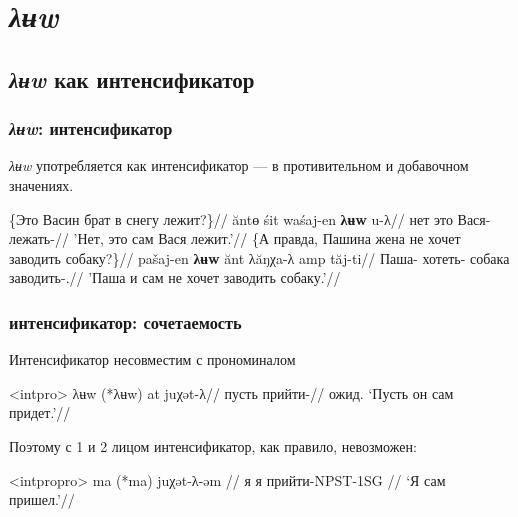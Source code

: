 \documentclass{beamer}
\begin{document}
\section{\textit{λʉw}}

\subsection{\textit{λʉw} как интенсификатор}

\begin{frame}
    \frametitle{\textit{λʉw}: интенсификатор}

    \textit{λʉw} употребляется как интенсификатор — в противительном и добавочном значениях.
    
     \begingl
        \glpreamble \{Это Васин брат в снегу лежит?\}//
        \gla ăntɵ śit waśaj-en \textbf{λʉw} u-λ//
        \glb нет это Вася-\Pssg{} \Int{} лежать-\Npst{}//
        \glft 'Нет, это сам Вася лежит.'//
    \endgl    
    \xe
     \begingl
        \glpreamble \{А правда, Пашина жена не хочет заводить собаку?\}//
        \gla pašaj-en \textbf{λʉw} ănt λăŋχa-λ amp tăj-ti//
        \glb Паша-\Pssg{} \Int{} \Neg{} хотеть-\Npst{} собака заводить-\Nfin.\Npst{}//
        \glft 'Паша и сам не хочет заводить собаку.'//
    \endgl    
    \xe
    
\end{frame}

\begin{frame}
    \frametitle{интенсификатор: сочетаемость}

    Интенсификатор несовместим с прономиналом

    \ex<intpro>
        \begingl
            \gla λʉw		(*λʉw)	at	juχət-λ//
            \glb \Int{}	\Int{}	пусть	прийти-\Npst//
            \glft ожид. ‘Пусть он сам придет.’//
        \endgl
    \xe

    Поэтому с 1 и 2 лицом интенсификатор, как правило, невозможен:

    \ex<intpropro>
        \begingl
            \gla ma	(*ma)		juχət-λ-əm            //
            \glb я	я		прийти-NPST-1SG            //
            \glft             ‘Я сам пришел.’//
        \endgl
    \xe
\end{frame}
\end{document}
